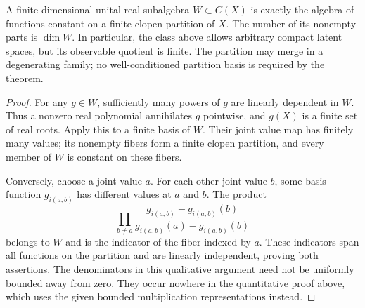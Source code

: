 \begin{proposition}
\label{prop:finite-observable-quotient}
A finite-dimensional unital real subalgebra $W\subset C(X)$ is exactly
the algebra of functions constant on a finite clopen partition of $X$.
The number of its nonempty parts is $\dim W$. In particular, the class
above allows arbitrary compact latent spaces, but its observable
quotient is finite. The partition may merge in a degenerating family;
no well-conditioned partition basis is required by the theorem.
\end{proposition}
\begin{proof}
For any $g\in W$, sufficiently many powers of $g$ are linearly
dependent in $W$. Thus a nonzero real polynomial annihilates $g$
pointwise, and $g(X)$ is a finite set of real roots. Apply this to a
finite basis of $W$. Their joint value map has finitely many values;
its nonempty fibers form a finite clopen partition, and every member
of $W$ is constant on these fibers.

Conversely, choose a joint value $a$. For each other joint value $b$,
some basis function $g_{i(a,b)}$ has different values at $a$ and $b$.
The product
\[
 \prod_{b\ne a}
 \frac{g_{i(a,b)}-g_{i(a,b)}(b)}
      {g_{i(a,b)}(a)-g_{i(a,b)}(b)}
\]
belongs to $W$ and is the indicator of the fiber indexed by $a$.
These indicators span all functions on the partition and are linearly
independent, proving both assertions. The denominators in this
qualitative argument need not be uniformly bounded away from zero.
They occur nowhere in the quantitative proof above, which uses the
given bounded multiplication representations instead.
\end{proof}

